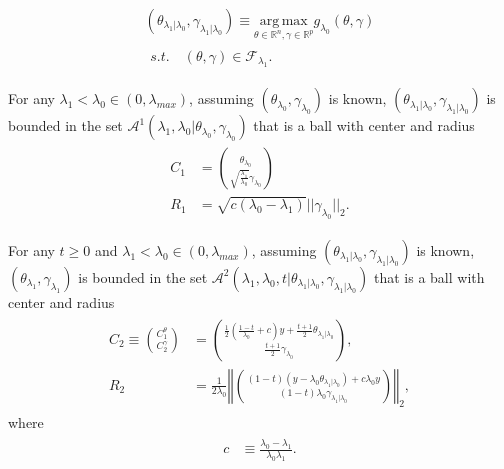 \begin{gather}
        \label{eq:dualmialt}
        (\theta_{\lambda_1|\lambda_0},\gamma_{\lambda_1|\lambda_0})\equiv\underset{\theta\in \mathbb{R}^{ n},\gamma\in\mathbb{R}^p}{\mathrm{arg\,max}}g_{\lambda_0}(\theta,\gamma)\\
        \begin{aligned}s.t.\quad (\theta,\gamma)\in \mathcal{F}_{\lambda_1}\nonumber.
        \end{aligned}
\end{gather}

\begin{theorem}
    \label{thm:1.1.alt}
    For any $\lambda_1<\lambda_{0}\in (0,\lambda_{max})$, assuming $(\theta_{\lambda_0},\gamma_{\lambda_0})$ is known, $(\theta_{\lambda_1|\lambda_0},\gamma_{\lambda_1|\lambda_0})$ is bounded in the set $\mathcal{A}^1(\lambda_1,\lambda_0|\theta_{\lambda_0},\gamma_{\lambda_0})$ that is a ball with center and radius
    \begin{gather}
        \begin{aligned}
            C_1&=\binom{\theta_{\lambda_0}}{\sqrt{\frac{\lambda_1}{\lambda_0}}\gamma_{\lambda_0}}\\
            R_1&=\sqrt{c(\lambda_0-\lambda_1)}||\gamma_{\lambda_0}||_2.
        \end{aligned}
    \end{gather}
\end{theorem}

\begin{theorem}
    \label{thm:1.2.alt}
    For any $t\geq0$ and $\lambda_1<\lambda_{0}\in (0,\lambda_{max})$, assuming $(\theta_{\lambda_1|\lambda_0},\gamma_{\lambda_1|\lambda_0})$ is known, $(\theta_{\lambda_1},\gamma_{\lambda_1})$ is bounded in the set $\mathcal{A}^2(\lambda_1,\lambda_0,t|\theta_{\lambda_1|\lambda_0},\gamma_{\lambda_1|\lambda_0})$ that is a ball with center and radius
    \begin{gather}
        \begin{aligned}
            C_2\equiv\binom{C_1^\theta}{C_2^\gamma}&=\binom{\frac{1}{2}(\frac{1-t}{\lambda_0}+c)y+\frac{t+1}{2}\theta_{\lambda_1|\lambda_0}}{\frac{t+1}{2}\gamma_{\lambda_0}},\\
            R_2&=\frac{1}{2\lambda_0}\left\Vert\binom{(1-t)(y-\lambda_0\theta_{\lambda_1|\lambda_0})+c\lambda_0y}{(1-t)\lambda_0\gamma_{\lambda_1|\lambda_0}}\right\Vert_2,
        \end{aligned}
    \end{gather}
    where
    \begin{gather}
        \begin{aligned}
            c&\equiv\frac{\lambda_0-\lambda_1}{\lambda_0\lambda_1}.\\
        \end{aligned}
    \end{gather}
\end{theorem}

